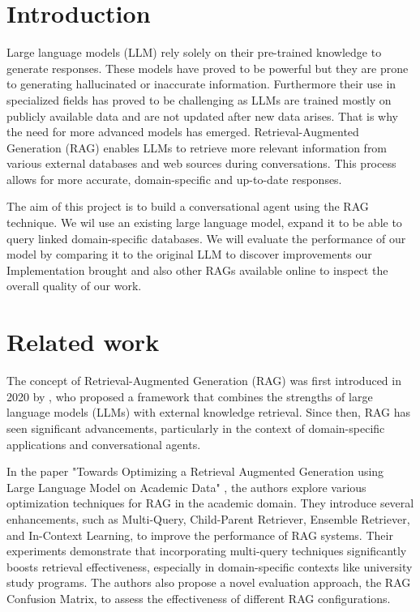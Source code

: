 \documentclass[fleqn,moreauthors,10pt]{ds_report}
\affiliation{\textit{Advisors: Aleš Žagar}}
\begin{document}
\flushbottom 

\maketitle 

\thispagestyle{empty} 

\section*{Introduction}
Large language models (LLM) rely solely on their pre-trained knowledge to generate responses. 
These models have proved to be powerful but they are prone to generating hallucinated or inaccurate information. 
Furthermore their use in specialized fields has proved to be challenging as LLMs are trained mostly on publicly available 
data and are not updated after new data arises. That is why the need for more advanced models has emerged. Retrieval-Augmented Generation (RAG) enables LLMs to 
retrieve more relevant information from various external databases and web sources during conversations. 
This process allows for more accurate, domain-specific and up-to-date responses.

The aim of this project is to build a conversational agent using the RAG technique. We wil use an existing large language model, 
expand it to be able to query linked domain-specific databases. We will evaluate 
the performance of our model by comparing it to the original LLM to discover improvements our Implementation brought and also other RAGs available online to inspect the overall quality of our work.


\section*{Related work}
The concept of Retrieval-Augmented Generation (RAG) was first introduced in 2020 by \cite{NEURIPS2020_6b493230}, who proposed a framework that combines the strengths of large language models (LLMs) with external knowledge retrieval. Since then, RAG has seen significant advancements, particularly in the context of domain-specific applications and conversational agents.

In the paper "Towards Optimizing a Retrieval Augmented Generation using Large Language Model on Academic Data" \cite{afzal2024towards}, the authors explore various optimization techniques for RAG in the academic domain. They introduce several enhancements, such as Multi-Query, Child-Parent Retriever, Ensemble Retriever, and In-Context Learning, to improve the performance of RAG systems. Their experiments demonstrate that incorporating multi-query techniques significantly boosts retrieval effectiveness, especially in domain-specific contexts like university study programs. The authors also propose a novel evaluation approach, the RAG Confusion Matrix, to assess the effectiveness of different RAG configurations.
\end{document}
